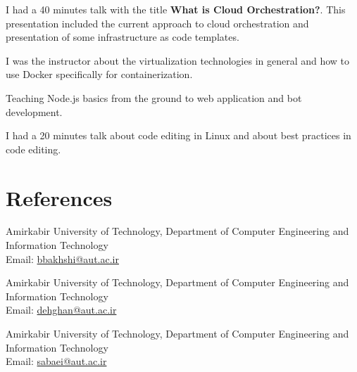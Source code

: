 \documentclass[]{deedy-resume-openfont}
\begin{document}
\begin{minipage}[t]{0.66\textwidth}
\sectionsep
{}
    I had a 40 minutes talk with the title \textbf{What is Cloud Orchestration?}.
    This presentation included the current approach to cloud orchestration and
    presentation of some infrastructure as code templates.

\sectionsep
{}
I was the instructor about the virtualization technologies in general
and how to use Docker specifically for containerization.
\sectionsep

Teaching Node.js basics from the ground to web application and bot development.
\sectionsep

I had a 20 minutes talk about code editing in Linux and about
best practices in code editing.

\sectionsep





\sectionsep

\section{References}
    Amirkabir University of Technology, Department of Computer Engineering and Information Technology \\
    Email: \href{mailto:bbakhshi@aut.ac.ir}{bbakhshi@aut.ac.ir}
\sectionsep

    Amirkabir University of Technology, Department of Computer Engineering and Information Technology \\
    Email: \href{mailto:dehghan@aut.ac.ir}{dehghan@aut.ac.ir}
\sectionsep

    Amirkabir University of Technology, Department of Computer Engineering and Information Technology \\
    Email: \href{mailto:sabaei@aut.ac.ir}{sabaei@aut.ac.ir}
\sectionsep

% 
% 

\end{minipage}
\end{document}
